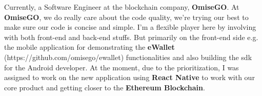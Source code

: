 

\begin{cvparagraph}

Currently, a Software Engineer at the blockchain company, \textbf{OmiseGO}. At \textbf{OmiseGO}, we do really care about the code quality, we're trying our best to make sure our code is concise and simple. I'm a flexible player here by involving with both front-end and back-end stuffs. But primarily on the front-end side e.g. the mobile application for demonstrating the \textbf{eWallet} (https://github.com/omisego/ewallet) functionalities and also building the sdk for the Android developer. At the moment, due to the prioritization, I was assigned to work on the new application using \textbf{React Native} to work with our core product and getting closer to the \textbf{Ethereum Blockchain}. 

\end{cvparagraph}
